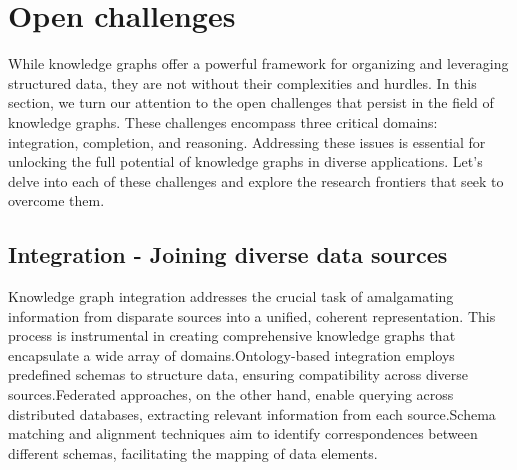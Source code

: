 
\section{Open challenges}\label{sec:kgs-challenges}
While knowledge graphs offer a powerful framework for organizing and leveraging structured data, they are not without their complexities and hurdles. In this section, we turn our attention to the open challenges that persist in the field of knowledge graphs. These challenges encompass three critical domains: integration, completion, and reasoning. Addressing these issues is essential for unlocking the full potential of knowledge graphs in diverse applications. Let's delve into each of these challenges and explore the research frontiers that seek to overcome them.



\subsection{Integration - Joining diverse data sources}
Knowledge graph integration addresses the crucial task of amalgamating information from disparate sources into a unified, coherent representation. This process is instrumental in creating comprehensive knowledge graphs that encapsulate a wide array of domains.Ontology-based integration employs predefined schemas to structure data, ensuring compatibility across diverse sources.Federated approaches, on the other hand, enable querying across distributed databases, extracting relevant information from each source.Schema matching and alignment techniques aim to identify correspondences between different schemas, facilitating the mapping of data elements.

